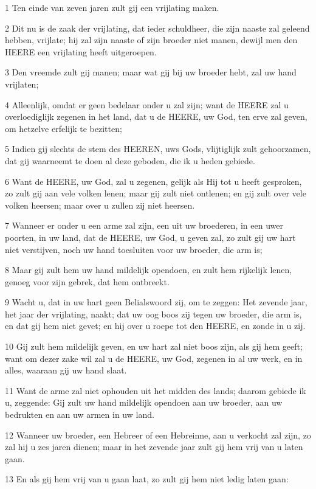 \par 1 Ten einde van zeven jaren zult gij een vrijlating maken.
\par 2 Dit nu is de zaak der vrijlating, dat ieder schuldheer, die zijn naaste zal geleend hebben, vrijlate; hij zal zijn naaste of zijn broeder niet manen, dewijl men den HEERE een vrijlating heeft uitgeroepen.
\par 3 Den vreemde zult gij manen; maar wat gij bij uw broeder hebt, zal uw hand vrijlaten;
\par 4 Alleenlijk, omdat er geen bedelaar onder u zal zijn; want de HEERE zal u overloediglijk zegenen in het land, dat u de HEERE, uw God, ten erve zal geven, om hetzelve erfelijk te bezitten;
\par 5 Indien gij slechts de stem des HEEREN, uws Gods, vlijtiglijk zult gehoorzamen, dat gij waarneemt te doen al deze geboden, die ik u heden gebiede.
\par 6 Want de HEERE, uw God, zal u zegenen, gelijk als Hij tot u heeft gesproken, zo zult gij aan vele volken lenen; maar gij zult niet ontlenen; en gij zult over vele volken heersen; maar over u zullen zij niet heersen.
\par 7 Wanneer er onder u een arme zal zijn, een uit uw broederen, in een uwer poorten, in uw land, dat de HEERE, uw God, u geven zal, zo zult gij uw hart niet verstijven, noch uw hand toesluiten voor uw broeder, die arm is;
\par 8 Maar gij zult hem uw hand mildelijk opendoen, en zult hem rijkelijk lenen, genoeg voor zijn gebrek, dat hem ontbreekt.
\par 9 Wacht u, dat in uw hart geen Belialswoord zij, om te zeggen: Het zevende jaar, het jaar der vrijlating, naakt; dat uw oog boos zij tegen uw broeder, die arm is, en dat gij hem niet gevet; en hij over u roepe tot den HEERE, en zonde in u zij.
\par 10 Gij zult hem mildelijk geven, en uw hart zal niet boos zijn, als gij hem geeft; want om dezer zake wil zal u de HEERE, uw God, zegenen in al uw werk, en in alles, waaraan gij uw hand slaat.
\par 11 Want de arme zal niet ophouden uit het midden des lands; daarom gebiede ik u, zeggende: Gij zult uw hand mildelijk opendoen aan uw broeder, aan uw bedrukten en aan uw armen in uw land.
\par 12 Wanneer uw broeder, een Hebreer of een Hebreinne, aan u verkocht zal zijn, zo zal hij u zes jaren dienen; maar in het zevende jaar zult gij hem vrij van u laten gaan.
\par 13 En als gij hem vrij van u gaan laat, zo zult gij hem niet ledig laten gaan:
